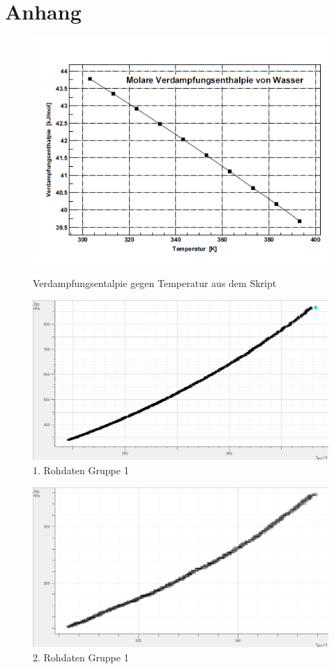 \documentclass[12pt,a4paper]{article}
\begin{document}
\section{Anhang}
\begin{figure}[H]
\centering
\includegraphics[scale=0.7]{Bilder/Verdampfungsentalpie.PNG}
\label{lambdaskirpt}
\caption{Verdampfungsentalpie gegen Temperatur aus dem Skript}
\end{figure}
\begin{figure}[H]
\centering
\includegraphics[scale=0.5]{Bilder/RohdatenHaupmessungGrp11.png}
\caption{1. Rohdaten Gruppe 1}
\end{figure}
\begin{figure}[H]
\centering
\includegraphics[scale=0.5]{Bilder/RohdatenHaupmessungGrp12.png}
\caption{2. Rohdaten Gruppe 1}
\end{figure}
\end{document}
